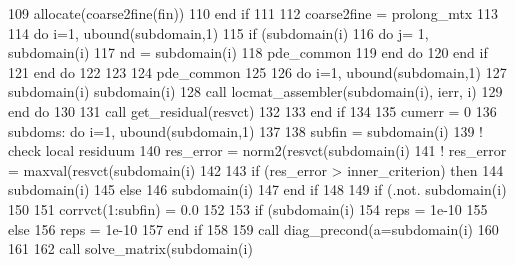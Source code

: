 \begin{DoxyCode}
109               \textcolor{keyword}{allocate}(coarse2fine(fin))
110 \textcolor{keywordflow}{            end if}
111             
112             coarse2fine = prolong_mtx%
113             
114             \textcolor{keywordflow}{do} i=1, ubound(subdomain,1)
115               \textcolor{keywordflow}{if} (subdomain(i)%
116                 \textcolor{keywordflow}{do} j= 1, subdomain(i)%
117                   nd = subdomain(i)%
118                   pde_common%
119 \textcolor{keywordflow}{                end do}
120 \textcolor{keywordflow}{              end if}
121 \textcolor{keywordflow}{            end do}
122               
123 
124             pde_common%
125 
126             \textcolor{keywordflow}{do} i=1, ubound(subdomain,1)
127               subdomain(i)%
      subdomain(i)%
128               \textcolor{keyword}{call }locmat_assembler(subdomain(i), ierr, i)
129 \textcolor{keywordflow}{            end do}
130 
131             \textcolor{keyword}{call }get_residual(resvct)
132 
133 \textcolor{keywordflow}{          end if}
134           
135           cumerr = 0
136           subdoms:  \textcolor{keywordflow}{do} i=1, ubound(subdomain,1)
137 
138             subfin = subdomain(i)%
139                 \textcolor{comment}{! check local residuum}
140             res\_error = norm2(resvct(subdomain(i)%
141     \textcolor{comment}{!                   res\_error = maxval(resvct(subdomain(i)%
142 
143             \textcolor{keywordflow}{if} (res\_error > inner_criterion) \textcolor{keywordflow}{then}
144               subdomain(i)%
145             \textcolor{keywordflow}{else}
146               subdomain(i)%
147 \textcolor{keywordflow}{            end if}
148             
149             \textcolor{keywordflow}{if} (.not. subdomain(i)%
150 
151               corrvct(1:subfin) = 0.0
152 
153               \textcolor{keywordflow}{if} (subdomain(i)%
154                 reps = 1e-10
155               \textcolor{keywordflow}{else}
156                 reps = 1e-10
157 \textcolor{keywordflow}{              end if}
158 
159               \textcolor{keyword}{call }diag_precond(a=subdomain(i)%
160               
161 
162               \textcolor{keyword}{call }solve_matrix(subdomain(i)%
}
\end{DoxyCode}
